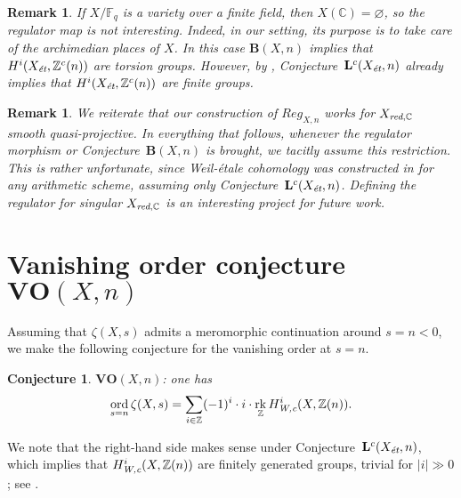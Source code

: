 \documentclass[10pt,a4paper,oneside,draft]{article}
\DeclareMathOperator{\ord}{ord}
\DeclareMathOperator{\rk}{rk}
\newcommand{\CC}{\mathbb{C}}
\newcommand{\FF}{\mathbb{F}}
\newcommand{\ZZ}{\mathbb{Z}}
\renewcommand{\emptyset}{\varnothing}
\newcommand{\et}{\text{\it \'{e}t}}
\newcommand{\red}{\text{\it red}}
\newcommand{\Wc}{\text{\it W,c}}
\theoremstyle{myplain}
\theoremstyle{mydefinition}
\newtheorem{conjecture}[theorem]{Conjecture}
\newtheorem{remark}[theorem]{Remark}
\numberwithin{equation}{section}
\begin{document}
\begin{remark}
  If $X/\FF_q$ is a variety over a finite field, then $X (\CC) = \emptyset$,
  so the regulator map is not interesting. Indeed, in our setting, its purpose
  is to take care of the archimedian places of $X$. In this case
  $\mathbf{B} (X,n)$ implies that $H^i (X_\et, \ZZ^c (n))$ are torsion groups.
  However, by \cite[Proposition~4.2]{Beshenov-Weil-etale-1},
  Conjecture~$\mathbf{L}^c (X_\et, n)$ already implies that
  $H^i (X_\et, \ZZ^c (n))$ are finite groups.
\end{remark}

\begin{remark}
  \label{rmk:regulator-is-defined-for-XC-smooth-quasi-proj}
  We reiterate that our construction of $Reg_{X,n}$ works for $X_{\red,\CC}$
  smooth quasi-projective. In everything that follows, whenever the regulator
  morphism or Conjecture~$\mathbf{B} (X,n)$ is brought, we tacitly assume this
  restriction. This is rather unfortunate, since Weil-\'{e}tale cohomology was
  constructed in \cite{Beshenov-Weil-etale-1} for any arithmetic scheme,
  assuming only Conjecture~$\mathbf{L}^c (X_\et,n)$. Defining the regulator for
  singular $X_{\red,\CC}$ is an interesting project for future work.
\end{remark}


\section{Vanishing order conjecture $\mathbf{VO} (X,n)$}
\label{sec:vanishing-order-conjecture}

Assuming that $\zeta (X,s)$ admits a meromorphic continuation around
$s = n < 0$, we make the following conjecture for the vanishing order at
$s = n$.

\begin{conjecture}
  $\mathbf{VO} (X,n)$: one has
  \[ \ord_{s=n} \zeta (X,s) =
    \sum_{i \in \ZZ} (-1)^i \cdot i \cdot \rk_\ZZ H^i_\Wc (X, \ZZ (n)). \]
\end{conjecture}

We note that the right-hand side makes sense under
Conjecture~$\mathbf{L}^c (X_\et,n)$, which implies that $H^i_\Wc (X, \ZZ (n))$
are finitely generated groups, trivial for $|i| \gg 0$;
see \cite[Proposition~7.12]{Beshenov-Weil-etale-1}.
\end{document}
